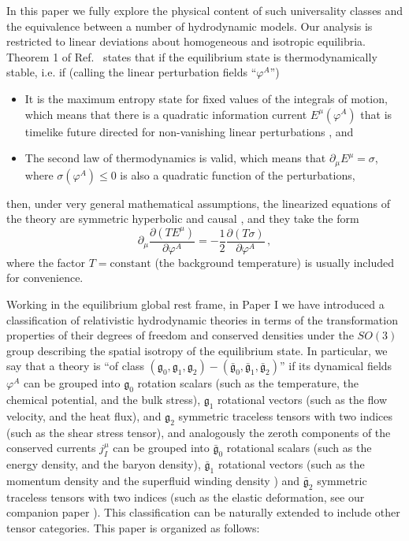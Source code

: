 \documentclass[a4paper, amsfonts, amssymb, amsmath, reprint, showkeys, nofootinbib, twoside, onecolumn,notitlepage]{revtex4-1}
\begin{document}
In this paper we fully explore the physical content of such universality classes and the equivalence between a number of hydrodynamic models. Our analysis is restricted to linear deviations about homogeneous and isotropic equilibria.
Theorem 1 of Ref.\ \cite{paperI} states that if the equilibrium state is thermodynamically stable, i.e. if (calling the linear perturbation fields ``$\varphi^A$'')
\begin{itemize}
    \item [(i)] It is the maximum entropy state for fixed values of the integrals of motion, which means that there is a quadratic information current $E^\mu(\varphi^A)$ that is timelike future directed for non-vanishing linear perturbations \cite{GavassinoGibbs2021,GavassinoCausality2021}, and
    \item[(ii)] The second law of thermodynamics is valid, which means that $\partial_\mu E^\mu=\sigma$, where $\sigma(\varphi^A)\leq 0$ is also a quadratic function of the perturbations,
\end{itemize}
then, under very general mathematical assumptions, the linearized equations of the theory are symmetric hyperbolic \cite{Kato2009} and causal \cite{Wald}, and they take the form
\begin{equation}\label{Fudamental}
\partial_\mu \dfrac{\partial (TE^\mu)}{\partial \varphi^A} = -\dfrac{1}{2} \dfrac{\partial(T \sigma)}{\partial \varphi^A} \, ,
\end{equation}
where the factor $T=\text{constant}$ (the background temperature) is usually included for convenience.

Working in the equilibrium global rest frame, in Paper I \cite{paperI}
we have introduced a classification of relativistic hydrodynamic theories in terms of the transformation properties of their degrees of freedom and conserved densities under the  $SO(3)$ group describing the spatial isotropy of the equilibrium state. In particular, we say that a theory is ``of class $(\mathfrak{g}_0,\mathfrak{g}_1,\mathfrak{g}_2)-(\bar{\mathfrak{g}}_0,\bar{\mathfrak{g}}_1,\bar{\mathfrak{g}}_2)$'' if its dynamical fields $\varphi^A$ can be grouped into $\mathfrak{g}_0$ rotation scalars (such as the temperature, the chemical potential, and the bulk stress), $\mathfrak{g}_1$ rotational vectors (such as the flow velocity, and the heat flux), and $\mathfrak{g}_2$ symmetric traceless tensors with two indices (such as the shear stress tensor), and analogously the zeroth components of the conserved currents $j^\mu_I$ can be grouped into $\bar{\mathfrak{g}}_0$ rotational scalars (such as the energy density, and the baryon density), $\bar{\mathfrak{g}}_1$ rotational vectors (such as the momentum density and the superfluid winding density \cite{AndreevMelnikovsky2004,Termo}) and $\bar{\mathfrak{g}}_2$ symmetric traceless tensors with two indices (such as the elastic deformation, see our companion paper \cite{paperI}). This classification can be naturally extended to include other tensor categories. This paper is organized as follows:
\end{document}
